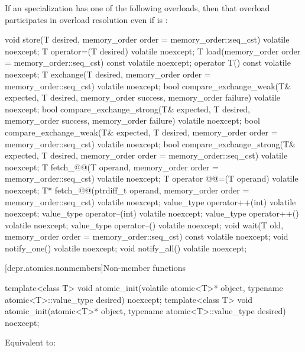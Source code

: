 \pnum
If an  specialization has one of the following overloads,
then that overload participates in overload resolution
even if  is :
\begin{codeblock}
void store(T desired, memory_order order = memory_order::seq_cst) volatile noexcept;
T operator=(T desired) volatile noexcept;
T load(memory_order order = memory_order::seq_cst) const volatile noexcept;
operator T() const volatile noexcept;
T exchange(T desired, memory_order order = memory_order::seq_cst) volatile noexcept;
bool compare_exchange_weak(T& expected, T desired,
                           memory_order success, memory_order failure) volatile noexcept;
bool compare_exchange_strong(T& expected, T desired,
                             memory_order success, memory_order failure) volatile noexcept;
bool compare_exchange_weak(T& expected, T desired,
                           memory_order order = memory_order::seq_cst) volatile noexcept;
bool compare_exchange_strong(T& expected, T desired,
                             memory_order order = memory_order::seq_cst) volatile noexcept;
T fetch_@@(T operand, memory_order order = memory_order::seq_cst) volatile noexcept;
T operator @@=(T operand) volatile noexcept;
T* fetch_@@(ptrdiff_t operand, memory_order order = memory_order::seq_cst) volatile noexcept;
value_type operator++(int) volatile noexcept;
value_type operator--(int) volatile noexcept;
value_type operator++() volatile noexcept;
value_type operator--() volatile noexcept;
void wait(T old, memory_order order = memory_order::seq_cst) const volatile noexcept;
void notify_one() volatile noexcept;
void notify_all() volatile noexcept;
\end{codeblock}

[depr.atomics.nonmembers]{Non-member functions}

%
\begin{itemdecl}
template<class T>
  void atomic_init(volatile atomic<T>* object, typename atomic<T>::value_type desired) noexcept;
template<class T>
  void atomic_init(atomic<T>* object, typename atomic<T>::value_type desired) noexcept;
\end{itemdecl}

\begin{itemdescr}
\pnum
\effects
Equivalent to: 
\end{itemdescr}

